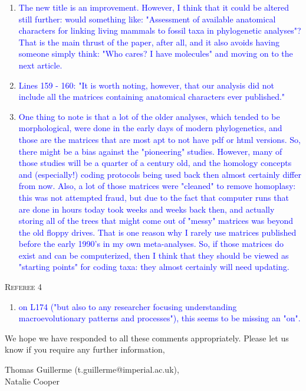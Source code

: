 \documentclass[12pt,letterpaper]{article}
\renewcommand{\section}[1]{%
\bigskip
\begin{center}
\begin{Large}
\normalfont\scshape #1
\medskip
\end{Large}
\end{center}}
\begin{document}
\begin{enumerate}
\item{\textcolor{blue}{The new title is an improvement.  However, I think that it could be altered still further: would something like: "Assessment of available anatomical characters for linking living mammals to fossil taxa in phylogenetic analyses"?  That is the main thrust of the paper, after all, and it also avoids having someone simply think: "Who cares? I have molecules" and moving on to the next article.}}

\item{\textcolor{blue}{Lines 159 - 160: "It is worth noting, however, that our analysis did not include all the matrices containing anatomical characters ever published."}}

\item{\textcolor{blue}{One thing to note is that a lot of the older analyses, which tended to be morphological, were done in the early days of modern phylogenetics, and those are the matrices that are most apt to not have pdf or html versions.  So, there might be a bias against the "pioneering" studies.  However, many of those studies will be a quarter of a century old, and the homology concepts and (especially!) coding protocols being used back then almost certainly differ from now.  Also, a lot of those matrices were "cleaned" to remove homoplasy: this was not attempted fraud, but due to the fact that computer runs that are done in hours today took weeks and weeks back then, and actually storing all of the trees that might come out of "messy" matrices was beyond the old floppy drives.  That is one reason why I rarely use matrices published before the early 1990's in my own meta-analyses.  So, if those matrices do exist and can be computerized, then I think that they should be viewed as "starting points" for coding taxa: they almost certainly will need updating.}}
\end{enumerate}

\section{Referee 4}

\begin{enumerate}
\item{\textcolor{blue}{on L174 ("but also to any researcher focusing understanding macroevolutionary patterns and processes"), this seems to be missing an "on".}}
\end{enumerate}



We hope we have responded to all these comments appropriately. Please let us know if you require any further information,\\
\bigskip


Thomas Guillerme (t.guillerme@imperial.ac.uk),\\
Natalie Cooper
\end{document}
